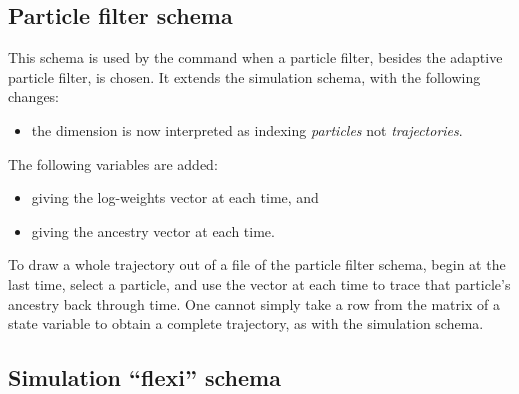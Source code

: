\subsection{Particle filter schema}

This schema is used by the  command when a particle filter,
besides the adaptive particle filter, is chosen. It extends the simulation
schema, with the following changes:
\begin{itemize}
\item the  dimension is now interpreted as indexing \emph{particles}
  not \emph{trajectories}.
\end{itemize}

The following variables are added:
\begin{itemize}
\item {} giving the log-weights vector at each time, and
\item {} giving the ancestry vector at each time.
\end{itemize}

\begin{tip}
To draw a whole trajectory out of a file of the particle filter schema, begin
at the last time, select a particle, and use the  vector at
each time to trace that particle's ancestry back through time. One cannot
simply take a row from the matrix of a state variable to obtain a complete
trajectory, as with the simulation schema.
\end{tip}

\subsection{Simulation ``flexi'' schema}

